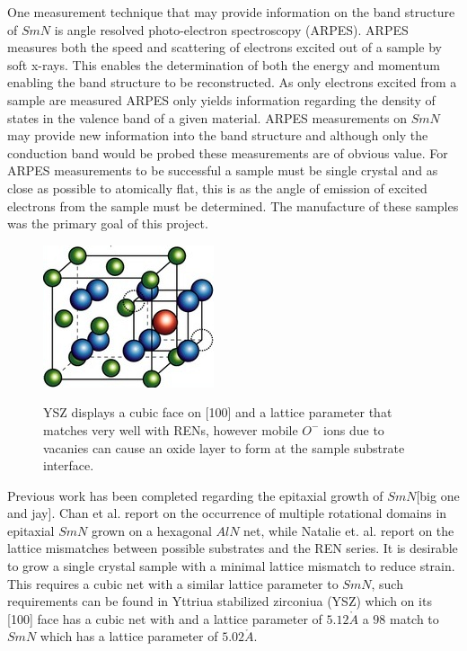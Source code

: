 \documentclass[11pt]{article}
\begin{document}
One measurement technique that may provide information on the band structure of $SmN$ is angle resolved photo-electron spectroscopy (ARPES). ARPES measures both the speed and scattering of electrons excited out of a sample by soft x-rays. This enables the determination of both the energy and momentum enabling the band structure to be reconstructed. As only electrons excited from a sample are measured ARPES only yields information regarding the density of states in the valence band of a given material. 
ARPES measurements on $SmN$ may provide new information into the band structure and although only the conduction band would be probed these measurements are of obvious value. For ARPES measurements to be successful a sample must be single crystal and as close as possible to atomically flat, this is as the angle of emission of excited electrons from the sample must be determined. The manufacture of these samples was the primary goal of this project. 
\begin{figure}[b!]


\includegraphics[width=\linewidth]{YSZ_Wikipedia.png}
\label{fig:boat1}
\caption{YSZ displays a cubic face on [100] and a lattice parameter that matches very well with RENs, however mobile $O^-$ ions due to vacanies can cause an oxide layer to form at the sample substrate interface.}
\end{figure}


Previous work has been completed regarding the epitaxial growth of $SmN$[big one and jay]. Chan et al. report on the occurrence of multiple rotational domains in epitaxial $SmN$ grown on a hexagonal $AlN$ net, while Natalie et. al. report on the lattice mismatches between possible substrates and the REN series. It is desirable to grow a single crystal sample with a minimal lattice mismatch to reduce strain. This requires a cubic net with a similar lattice parameter to $SmN$, such requirements can be found in Yttriua stabilized zirconiua (YSZ) which on its [100] face has a cubic net with and a lattice parameter of $5.12\mathring{A}$ a $98$ match to $SmN$ which has a lattice parameter of $5.02\mathring{A}$.
\end{document}
